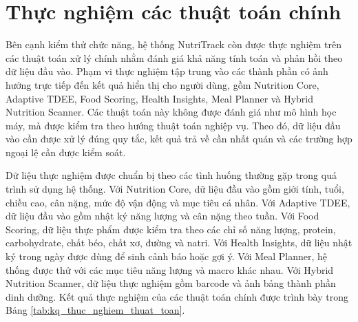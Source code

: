 \documentclass[12pt, a4paper]{report}
\begin{document}
\section{Thực nghiệm các thuật toán chính}Bên cạnh kiểm thử chức năng, hệ thống NutriTrack còn được thực nghiệm trên các thuật toán xử lý chính nhằm đánh giá khả năng tính toán và phản hồi theo dữ liệu đầu vào. Phạm vi thực nghiệm tập trung vào các thành phần có ảnh hưởng trực tiếp đến kết quả hiển thị cho người dùng, gồm Nutrition Core, Adaptive TDEE, Food Scoring, Health Insights, Meal Planner và Hybrid Nutrition Scanner. Các thuật toán này không được đánh giá như mô hình học máy, mà được kiểm tra theo hướng thuật toán nghiệp vụ. Theo đó, dữ liệu đầu vào cần được xử lý đúng quy tắc, kết quả trả về cần nhất quán và các trường hợp ngoại lệ cần được kiểm soát.

Dữ liệu thực nghiệm được chuẩn bị theo các tình huống thường gặp trong quá trình sử dụng hệ thống. Với Nutrition Core, dữ liệu đầu vào gồm giới tính, tuổi, chiều cao, cân nặng, mức độ vận động và mục tiêu cá nhân. Với Adaptive TDEE, dữ liệu đầu vào gồm nhật ký năng lượng và cân nặng theo tuần. Với Food Scoring, dữ liệu thực phẩm được kiểm tra theo các chỉ số năng lượng, protein, carbohydrate, chất béo, chất xơ, đường và natri. Với Health Insights, dữ liệu nhật ký trong ngày được dùng để sinh cảnh báo hoặc gợi ý. Với Meal Planner, hệ thống được thử với các mục tiêu năng lượng và macro khác nhau. Với Hybrid Nutrition Scanner, dữ liệu thực nghiệm gồm barcode và ảnh bảng thành phần dinh dưỡng. Kết quả thực nghiệm của các thuật toán chính được trình bày trong Bảng \ref{tab:kq_thuc_nghiem_thuat_toan}.
\end{document}
